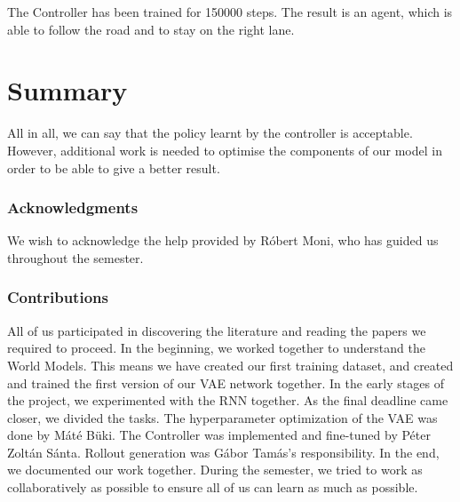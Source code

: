 \documentclass{article}
\begin{document}
The Controller has been trained for 150000 steps. The result is an agent, which is able to follow the road and to stay on the right lane.


\section{Summary}
All in all, we can say that the policy learnt by the controller is acceptable. However, additional work is needed to optimise the components of our model in order to be able to give a better result.


\subsubsection*{Acknowledgments}

We wish to acknowledge the help provided by Róbert Moni, who has guided us throughout the semester.

\subsubsection*{Contributions}
All of us participated in discovering the literature and reading the papers we required to proceed. In the beginning, we worked together to understand the World Models. This means we have created our first training dataset, and created and trained the first version of our VAE network together. In the early stages of the project, we experimented with the RNN together. As the final deadline came closer, we divided the tasks. The hyperparameter optimization of the VAE was done by Máté Büki. The Controller was implemented and fine-tuned by Péter Zoltán Sánta. Rollout generation was Gábor Tamás's responsibility. In the end, we documented our work together. During the semester, we tried to work as collaboratively as possible to ensure all of us can learn as much as possible.



\small


\end{document}
